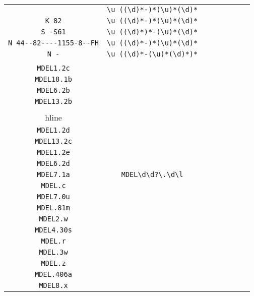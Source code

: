 \begin{longtable}{cccccccc}
\begin{tabular}{ll}
    \verb|O | & \verb|\u ((\d)*-)*(\u)*(\d)*|\\
\verb|K 82| & \verb|\u ((\d)*-)*(\u)*(\d)*|\\
\verb|S -S61| & \verb|\u ((\d)*)*-(\u)*(\d)*|\\
\verb|N 44--82----1155-8--FH| & \verb|\u ((\d)*-)*(\u)*(\d)*|\\
\verb|N -| & \verb|\u ((\d)*-(\u)*(\d)*)*|
\end{tabular}
\\\midrule 
\begin{tabular}{l}
    \verb|MDEL18.1a|\\
\verb|MDEL1.2c|\\
\verb|MDEL18.1b|\\
\verb|MDEL6.2b|\\
\verb|MDEL13.2b|\\
\\hline\\
\verb|MDEL1.2d|\\
\verb|MDEL13.2c|\\
\verb|MDEL1.2e|\\
\verb|MDEL6.2d|\\
\verb|MDEL7.1a|
\end{tabular}

&
\verb|MDEL\d\d?\.\d\l|
&

\begin{tabular}{l}
    \verb|MDEL(\d)*\.(\d)*\l|\\
\verb|MDEL.c|\\
\verb|MDEL7.0u|\\
\verb|MDEL.81m|\\
\verb|MDEL2.w|\\
\verb|MDEL4.30s|
\end{tabular}

&

\begin{tabular}{l}
    \verb|MDEL(\d)*\.(\d)*\l|\\
\verb|MDEL.r|\\
\verb|MDEL.3w|\\
\verb|MDEL.z|\\
\verb|MDEL.406a|\\
\verb|MDEL8.x|
\end{tabular}

&


\end{longtable}
